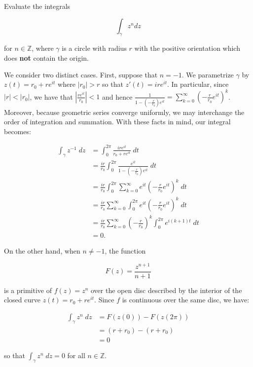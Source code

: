 Evaluate the integrals

$$
\int_{\gamma} z^n dz
$$

for $n \in \mathbb{Z}$, where $\gamma$ is a circle with radius $r$ with the positive orientation which does \textbf{not} 
contain the origin.

\begin{solution}
    We consider two distinct cases. First, suppose that $n = -1$. We parametrize $\gamma$ by $z(t) = r_0 + r e^{it}$ 
    where $|r_0| > r$ so that $z'(t) = i r e^{it}$. In particular, since $|r| < |r_0|$, we have that 
    $\left| \frac{r e^{it}}{r_0} \right| < 1$ and hence 
    $\frac{1}{1 - \left( -\frac{r}{r_0} \right) e^{i t}} = \sum\limits_{k=0}^{\infty} \left( -\frac{r}{r_0} e^{i t} \right)^k$.
    Moreover, because geometric series converge uniformly, we may interchange the order of integration and summation.
    With these facts in mind, our integral becomes:

    \begin{align*}
        \int_{\gamma} z^{-1} \; dz &= \int_{0}^{2 \pi} \frac{i r e^{it}}{r_0 + r e^{i t}} \; dt \\
                                   &= \frac{ir}{r_0} \int_{0}^{2 \pi} \frac{e^{it}}{1 - \left( -\frac{r}{r_0} \right) e^{i t}} \; dt \\
                                   &= \frac{ir}{r_0} \int_{0}^{2 \pi} \sum\limits_{k=0}^{\infty} e^{it} \left( -\frac{r}{r_0} e^{i t} \right)^k \; dt \\
                                   &= \frac{ir}{r_0} \sum\limits_{k=0}^{\infty} \int_{0}^{2 \pi} e^{it} \left( -\frac{r}{r_0} e^{i t} \right)^k \; dt \\
                                   &= \frac{ir}{r_0} \sum\limits_{k=0}^{\infty} \left( -\frac{r}{r_0} \right)^k \int_{0}^{2 \pi} e^{i(k + 1)t} \; dt \\
                                   &= 0.
    \end{align*}

    On the other hand, when $n \neq -1$, the function 

    $$
    F(z) = \frac{z^{n + 1}}{n + 1}
    $$

    is a primitive of $f(z) = z^n$ over the open disc described by the interior of the closed curve 
    $z(t) = r_0 + r e^{it}$. Since $f$ is continuous over the same disc, we have: 

    \begin{align*}
        \int_{\gamma} z^n \; dz &= F(z(0)) - F(z(2 \pi)) \\
                                &= (r + r_0) - (r + r_0) \\
                                &= 0
    \end{align*}

    so that $\int_{\gamma} z^n \; dz = 0$ for all $n \in \mathbb{Z}$.
    \ \\
\end{solution}
